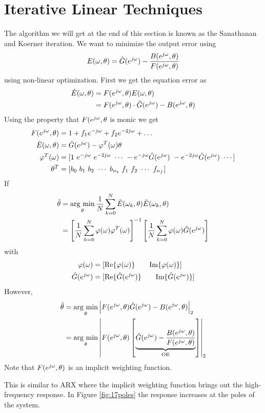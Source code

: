 \section{Iterative Linear Techniques}
The algorithm we will get at the end of this section is known as the Sanathanan and Koerner iteration. We want to minimize the output error using
$$E(\omega,\theta) = \hat{G}(e^{j\omega}) - \frac{B(e^{j\omega},\theta)}{F(e^{j\omega},\theta)}$$
using non-linear optimization. First we get the equation error as
\begin{align*}
\tilde{E}(\omega,\theta) &= F(e^{j\omega},\theta)E(\omega,\theta) \\
&= F(e^{j\omega},\theta)\cdot\tilde{G}(e^{j\omega}) - B(e^{j\omega},\theta)
\end{align*}
Using the property that $F(e^{j\omega},\theta$ is monic we get
\begin{align*}
F(e^{j\omega},\theta) &= 1 + f_1e^{-j\omega} + f_2e^{-2j\omega} + \ldots \\
\tilde{E}(\omega,\theta) &= \hat{G}(e^{j\omega}) - \varphi^T(\omega)\theta \\
\varphi^T(\omega) &= [1 ~ e^{-j\omega} ~ e^{-2j\omega} ~ \cdots ~ -e^{-j\omega}\hat{G}(e^{j\omega}) ~ -e^{-2j\omega}\hat{G}(e^{j\omega}) ~ \cdots] \\
\theta^T &= [b_0 ~ b_1 ~ b_2 ~ \cdots ~ b_{n_b} ~ f_1 ~ f_2 ~ \cdots ~ f_{n_f}]
\end{align*}
If
\begin{align*}
\hat{\theta} &= \mathop{\arg\,\min}\limits_\theta \frac{1}{N}\sum_{k=0}^N\tilde{E}(\omega_k,\theta)\tilde{E}(\omega_k,\theta) \\
&= \left[\frac{1}{N}\sum_{k=0}^N\varphi(\omega)\varphi^T(\omega)\right]^{-1}\left[\frac{1}{N}\sum_{k=0}^N\varphi(\omega)\hat{G}(e^{j\omega})\right]
\end{align*}
with
\begin{align*}
\varphi(\omega) &= [\text{Re}\{\varphi(\omega)\} \qquad \text{Im}\{\varphi(\omega)\}] \\
\hat{G}(e^{j\omega}) &= [\text{Re}\{\hat{G}(e^{j\omega})\} \qquad \text{Im}\{\hat{G}(e^{j\omega})\}]
\end{align*}
However,
\begin{align*}
\hat{\theta} &= \mathop{\arg\,\min}\limits_\theta \left|F(e^{j\omega},\theta)\hat{G}(e^{j\omega}) - B(e^{j\omega},\theta)\right|_2 \\
&= \mathop{\arg\,\min}\limits_\theta \left|F(e^{j\omega},\theta)\left[\underbrace{\hat{G}(e^{j\omega}) - \frac{B(e^{j\omega},\theta)}{F(e^{j\omega},\theta)}}_{\text{OE}}\right]\right|_2
\end{align*}
Note that $F(e^{j\omega},\theta)$ is an implicit weighting function.

This is similar to ARX where the implicit weighting function brings out the high-frequency response. In Figure \ref{fig:17poles} the response increases at the poles of the system.

